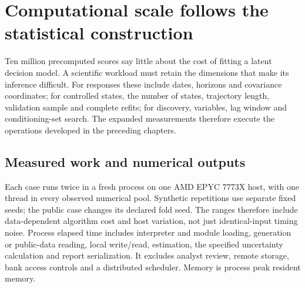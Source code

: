 \section{Computational scale follows the statistical construction}
\label{s5:dominant-workloads}
Ten million precomputed scores say little about the cost of fitting a latent
decision model. A scientific workload must retain the dimensions that make
its inference difficult. For responses these include dates, horizons and
covariance coordinates; for controlled states, the number of states,
trajectory length, validation sample and complete refits; for discovery,
variables, lag window and conditioning-set search. The expanded measurements
therefore execute the operations developed in the preceding chapters.

\subsection{Measured work and numerical outputs}
Each case runs twice in a fresh process on one AMD EPYC 7773X host, with one
thread in every observed numerical pool. Synthetic repetitions use separate
fixed seeds; the public case changes its declared fold seed. The ranges
therefore include data-dependent algorithm cost and host variation, not just
identical-input timing noise. Process elapsed time includes interpreter and
module loading, generation or public-data reading, local write/read,
estimation, the specified uncertainty calculation and report serialization.
It excludes analyst review, remote storage, bank access controls and a
distributed scheduler. Memory is process peak resident memory.

